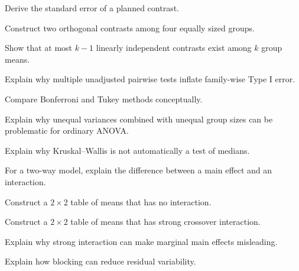 \begin{exercise}[3]
Derive the standard error of a planned contrast.
\end{exercise}

\begin{exercise}[3]
Construct two orthogonal contrasts among four equally sized groups.
\end{exercise}

\begin{exercise}[3]
Show that at most \(k-1\) linearly independent contrasts exist among
\(k\) group means.
\end{exercise}

\begin{exercise}[3]
Explain why multiple unadjusted pairwise tests inflate family-wise Type I
error.
\end{exercise}

\begin{exercise}[3]
Compare Bonferroni and Tukey methods conceptually.
\end{exercise}

\begin{exercise}[3]
Explain why unequal variances combined with unequal group sizes can be
problematic for ordinary ANOVA.
\end{exercise}

\begin{exercise}[3]
Explain why Kruskal--Wallis is not automatically a test of medians.
\end{exercise}

\begin{exercise}[3]
For a two-way model, explain the difference between a main effect and an
interaction.
\end{exercise}

\begin{exercise}[3]
Construct a \(2\times2\) table of means that has no interaction.
\end{exercise}

\begin{exercise}[3]
Construct a \(2\times2\) table of means that has strong crossover
interaction.
\end{exercise}

\begin{exercise}[3]
Explain why strong interaction can make marginal main effects
misleading.
\end{exercise}

\begin{exercise}[3]
Explain how blocking can reduce residual variability.
\end{exercise}

